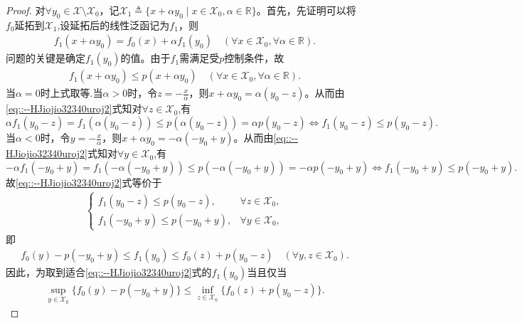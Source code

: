 \documentclass[../../main.tex]{subfiles}%
\begin{document}
\begin{proof}
对$\forall y_0 \in \mathscr{X} \setminus \mathscr{X}_0$，记$\mathscr{X}_1 \triangleq \{x + \alpha y_0 \mid x \in \mathscr{X}_0, \alpha \in \mathbb{R}\}$。首先，先证明可以将$f_0$延拓到$\mathscr{X}_1$,设延拓后的线性泛函记为$f_1$，则
\begin{align}\label{eqIOUHIO323847237894728947892}
f_1(x + \alpha y_0) = f_0(x) + \alpha f_1(y_0) \quad (\forall x \in \mathscr{X}_0, \forall \alpha \in \mathbb{R}).
\end{align}
问题的关键是确定$f_1(y_0)$的值。由于$f_1$需满足受$p$控制条件，故
\begin{align}
f_1(x + \alpha y_0) \leqslant p(x + \alpha y_0) \quad (\forall x \in \mathscr{X}_0, \forall \alpha \in \mathbb{R}). \label{eq::--HJiojio32340uroj2}
\end{align}
当$\alpha=0$时上式取等.当$\alpha >0$时，令$z=-\frac{x}{\alpha}$，则$x+\alpha y_0=\alpha \left( y_0-z \right)$。从而由\eqref{eq::--HJiojio32340uroj2}式知对$\forall z\in \mathscr{X}_0$,有
$$\alpha f_1\left( y_0-z \right) =f_1\left( \alpha \left( y_0-z \right) \right) \leqslant p\left( \alpha \left( y_0-z \right) \right) =\alpha p\left( y_0-z \right) \Longleftrightarrow f_1\left( y_0-z \right) \leqslant p\left( y_0-z \right) .$$
当$\alpha <0$时，令$y=-\frac{x}{\alpha}$，则$x+\alpha y_0=-\alpha \left( -y_0+y \right)$。从而由\eqref{eq::--HJiojio32340uroj2}式知对$\forall y\in \mathscr{X}_0$,有
$$-\alpha f_1\left( -y_0+y \right) =f_1\left( -\alpha \left( -y_0+y \right) \right) \leqslant p\left( -\alpha \left( -y_0+y \right) \right) =-\alpha p\left( -y_0+y \right) \Longleftrightarrow f_1\left( -y_0+y \right) \leqslant p\left( -y_0+y \right) .$$
故\eqref{eq::--HJiojio32340uroj2}式等价于
\begin{align*}
\begin{cases}
f_1(y_0 - z) \leqslant p(y_0 - z), & \forall z \in \mathscr{X}_0, \\
f_1(-y_0 + y) \leqslant p(-y_0 + y), & \forall y \in \mathscr{X}_0,
\end{cases}
\end{align*}
即
\begin{align*}
f_0(y) - p(-y_0 + y) \leqslant f_1(y_0) \leqslant f_0(z) + p(y_0 - z) \quad (\forall y, z \in \mathscr{X}_0).
\end{align*}
因此，为取到适合\eqref{eq::--HJiojio32340uroj2}式的$f_1(y_0)$当且仅当
\begin{align}
\sup_{y \in \mathscr{X}_0} \{f_0(y) - p(-y_0 + y)\} \leqslant \inf_{z \in \mathscr{X}_0} \{f_0(z) + p(y_0 - z)\}. \label{eq::--HJiojio32340uroj3}

\end{align}
\end{proof}
\end{document}
